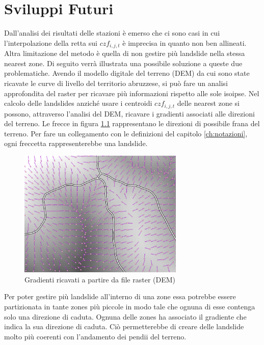 
\chapter{Sviluppi Futuri} 
\label{ch:sviluppiFuturi}
Dall'analisi dei risultati delle stazioni è emerso che 
ci sono casi in cui l'interpolazione della retta sui $czf_{i,j,t}$ è imprecisa in quanto non ben allineati.
Altra limitazione del metodo è quella di non gestire più landslide nella stessa nearest zone.
Di seguito verrà illustrata una possibile soluzione a queste due problematiche. Avendo il modello digitale del terreno (DEM) da cui sono state ricavate le curve di livello del territorio abruzzese, si può fare un analisi approfondita del raster per ricavare più informazioni rispetto alle sole isoipse.   
Nel calcolo delle landslides anziché usare i centroidi $czf_{i,j,t}$ delle nearest zone si possono, attraverso l'analisi del DEM, ricavare i gradienti associati alle direzioni del terreno.
Le frecce in figura \ref{fig:gradienti}  rappresentano le direzioni di possibile frana del terreno. Per fare un collegamento con le definizioni del capitolo \ref{ch:notazioni}, ogni freccetta rappresenterebbe una landslide. \cite{gradienti}

\begin{figure}[H]
	\centering
	\includegraphics[width=0.7\textwidth]{images/gradienti.png}
	\caption{Gradienti ricavati a partire da file raster (DEM)}
	\label{fig:gradienti}
\end{figure}
Per poter gestire più landslide all'interno di una zone essa potrebbe essere partizionata in tante zones più piccole in modo tale che ognuna di esse contenga solo una direzione di caduta.
Ognuna delle zones ha associato il gradiente che indica la sua direzione di caduta.
Ciò permetterebbe di creare delle landslide molto più coerenti con l'andamento dei pendii del terreno.
 


